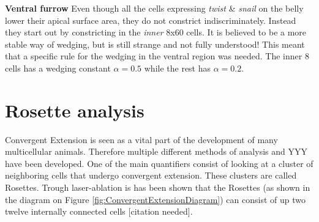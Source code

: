 \textbf{Ventral furrow}
Even though all the cells expressing \textit{twist} \& \textit{snail} on the belly lower their apical surface area, they do not constrict indiscriminately. Instead they start out by constricting in the \textit{inner} 8x60 cells. It is believed to be a more stable way of wedging, but is still strange and not fully understood! This meant that a specific rule for the wedging in the ventral region was needed. The inner 8 cells has a wedging constant $\alpha = 0.5$ while the rest has $\alpha = 0.2$.

\section{Rosette analysis}
Convergent Extension is seen as a vital part of the development of many  multicellular animals. Therefore multiple different methods of analysis and YYY have been developed.
One of the main quantifiers consist of looking at a cluster of neighboring cells that undergo convergent extension. These clusters are called Rosettes. Trough laser-ablation is has been shown that the Rosettes (as shown in the diagram on Figure \ref{fig:ConvergentExtensionDiagram}) can consist of up two twelve internally connected cells [citation needed].





